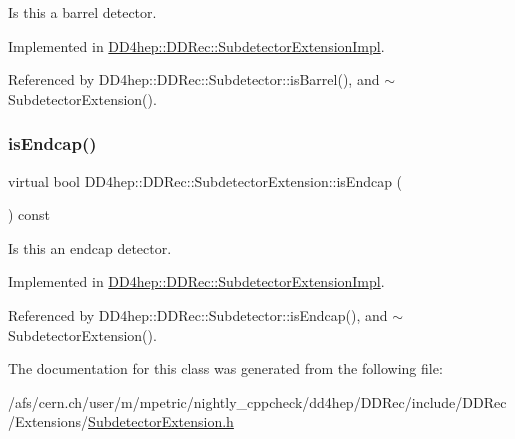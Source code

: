 Is this a barrel detector. 



Implemented in \hyperlink{class_d_d4hep_1_1_d_d_rec_1_1_subdetector_extension_impl_a1e89ba5b16e3697f85612cc7651cd56b}{D\+D4hep\+::\+D\+D\+Rec\+::\+Subdetector\+Extension\+Impl}.



Referenced by D\+D4hep\+::\+D\+D\+Rec\+::\+Subdetector\+::is\+Barrel(), and $\sim$\+Subdetector\+Extension().

\hypertarget{class_d_d4hep_1_1_d_d_rec_1_1_subdetector_extension_a57a044e743f899391ac4a89fc0035e08}{}\label{class_d_d4hep_1_1_d_d_rec_1_1_subdetector_extension_a57a044e743f899391ac4a89fc0035e08} 
\subsubsection{\texorpdfstring{is\+Endcap()}{isEndcap()}}
{\footnotesize\ttfamily virtual bool D\+D4hep\+::\+D\+D\+Rec\+::\+Subdetector\+Extension\+::is\+Endcap (\begin{DoxyParamCaption}{ }\end{DoxyParamCaption}) const\hspace{0.3cm}{\ttfamily [pure virtual]}}



Is this an endcap detector. 



Implemented in \hyperlink{class_d_d4hep_1_1_d_d_rec_1_1_subdetector_extension_impl_a2381b0fbcdaaedff410cff6a56c74d45}{D\+D4hep\+::\+D\+D\+Rec\+::\+Subdetector\+Extension\+Impl}.



Referenced by D\+D4hep\+::\+D\+D\+Rec\+::\+Subdetector\+::is\+Endcap(), and $\sim$\+Subdetector\+Extension().



The documentation for this class was generated from the following file\+:\begin{DoxyCompactItemize}
\item 
/afs/cern.\+ch/user/m/mpetric/nightly\+\_\+cppcheck/dd4hep/\+D\+D\+Rec/include/\+D\+D\+Rec/\+Extensions/\hyperlink{_subdetector_extension_8h}{Subdetector\+Extension.\+h}\end{DoxyCompactItemize}
